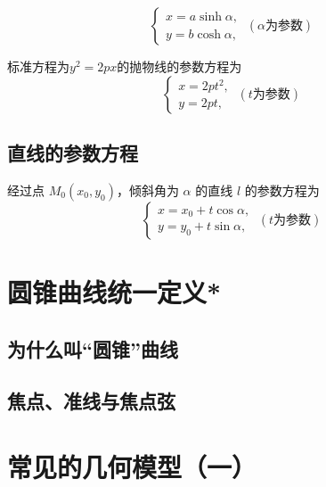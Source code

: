 \[\left\{
    \begin{gathered}
        x = a \sinh \alpha, \\
        y = b \cosh \alpha,
    \end{gathered}\right.
    \ (\alpha\text{为参数})
    \]

\begin{theorem}
标准方程为\(y^2=2px\)的抛物线的参数方程为
\[\left\{
    \begin{gathered}
        x = 2pt^2, \\
        y = 2pt,
    \end{gathered}\right.
    \ (t\text{为参数})
    \]
\end{theorem}


\clearpage



\subsection{直线的参数方程}
\begin{theorem}[直线的参数方程]
经过点 \( M_0(x_0, y_0) \)，倾斜角为 \( \alpha \) 的直线 \( l \) 的参数方程为
\[\left\{
\begin{gathered}
    x = x_0 + t \cos \alpha, \\
    y = y_0 + t \sin \alpha,
\end{gathered}\right.
\ (t\text{为参数})
\]
\end{theorem}
\begin{corollary}
    
\end{corollary}
\clearpage




\section{圆锥曲线统一定义*}
\subsection{为什么叫“圆锥”曲线}
\clearpage
\subsection{焦点、准线与焦点弦}%
\clearpage





\section{常见的几何模型（一）}

